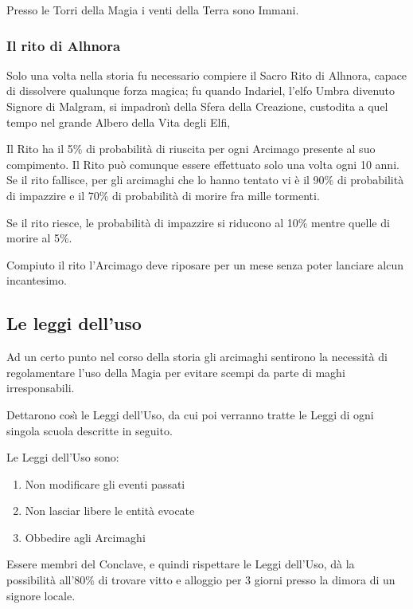 Presso le Torri della Magia i venti della Terra sono Immani.

{\raggedright \subsubsection{Il rito di Alhnora}}

Solo una volta nella storia fu necessario compiere il Sacro Rito di
Alhnora, capace di dissolvere qualunque forza magica; fu quando
Indariel, l'elfo Umbra divenuto Signore di Malgram, si impadron\`{\i} 
della Sfera della Creazione, custodita a quel tempo nel grande Albero
della Vita degli Elfi,

Il Rito ha il 5\% di probabilit\`a di riuscita per ogni Arcimago
presente al suo compimento.  Il Rito pu\`o comunque essere effettuato
solo una volta ogni 10 anni. Se il rito fallisce, per gli arcimaghi
che lo hanno tentato vi \`e il 90\% di probabilit\`a di impazzire e il
70\% di probabilit\`a di morire fra mille tormenti.

Se il rito riesce, le probabilit\`a di impazzire si riducono al 10\%
mentre quelle di morire al 5\%.

Compiuto il rito l'Arcimago deve riposare per un mese senza poter
lanciare alcun incantesimo.


\subsection{Le leggi dell'uso}

Ad un certo punto nel corso della storia gli arcimaghi sentirono la
necessit\`a di regolamentare l'uso della Magia per evitare scempi da
parte di maghi irresponsabili.

Dettarono cos\`{\i} le Leggi dell'Uso, da cui poi verranno tratte le
Leggi di ogni singola scuola descritte in seguito.

Le Leggi dell'Uso sono: 

\begin{enumerate}
  \itemsep -6pt
\item Non modificare gli eventi passati 
\item Non lasciar libere le entit\`a evocate 
\item Obbedire agli Arcimaghi 
\end{enumerate}


Essere membri del Conclave, e quindi rispettare le Leggi dell'Uso, d\`a
la possibilit\`a all'80\% di trovare vitto e alloggio per 3 giorni
presso la dimora di un signore locale.
\fi

